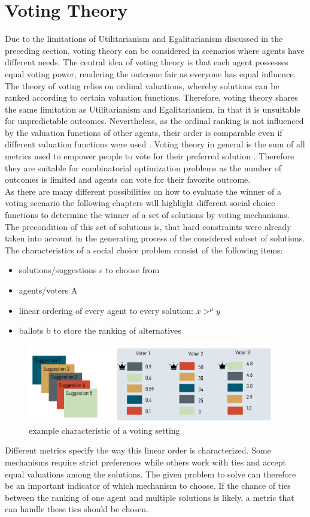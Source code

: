 \documentclass[german, a4paper, 11pt, oneside]{scrbook}
\begin{document}
\section{Voting Theory}
Due to the limitations of Utilitarianism and Egalitarianism discussed in the preceding section, voting theory can be considered in scenarios where agents have different needs. The central idea of voting theory is that each agent possesses equal voting power, rendering the outcome fair as everyone has equal influence. The theory of voting relies on ordinal valuations, whereby solutions can be ranked according to certain valuation functions. \cite{Bhavnani.2022b}   Therefore, voting theory shares the same limitation as Utilitarianism and Egalitarianism, in that it is unsuitable for unpredictable outcomes. Nevertheless, as the ordinal ranking is not influenced by the valuation functions of other agents, their order is comparable even if different valuation functions were used \cite{Bhavnani.2022b}. Voting theory in general is the sum of all metrics used to empower people to vote for their preferred solution \cite{Brandt}. Therefore they are suitable for combinatorial optimization problems as the number of outcomes is limited and agents can vote for their favorite outcome. \\As there are many different possibilities on how to evaluate the winner of a voting scenario the following chapters will highlight different social choice functions to determine the winner of a set of solutions by voting mechanisms. The precondition of this set of solutions is, that hard constraints were already taken into account in the generating process of the considered subset of solutions.  The characteristics of a social choice problem consist of the following items: 
\begin{itemize}
  \item solutions/suggestions s to choose from
  \item agents/voters A
  \item linear ordering of every agent to every solution:  $x>^\mu y$
  \item ballots b to store the ranking of alternatives 
\end{itemize}
\cite{Brandt}
\begin{figure}[h]
\centering
\includegraphics[height=3.4cm]{Voting_setting}
\caption{example characteristic of a voting setting}
\end{figure}
Different metrics specify the way this linear order is characterized. Some mechanisms require strict preferences while others work with ties and accept equal valuations among the solutions. The given problem to solve can therefore be an important indicator of which mechanism to choose. \cite{Brandt} If the chance of ties between the ranking of one agent and multiple solutions is likely, a metric that can handle these ties should be chosen.
\end{document}
